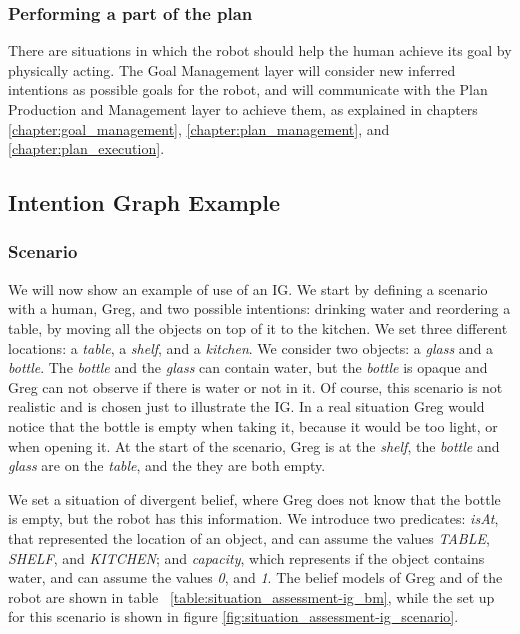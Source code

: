 \subsubsection{Performing a part of the plan}
There are situations in which the robot should help the human achieve its goal by physically acting. The Goal Management layer will consider new inferred intentions as possible goals for the robot, and will communicate with the Plan Production and Management layer to achieve them, as explained in chapters \ref{chapter:goal_management}, \ref{chapter:plan_management}, and \ref{chapter:plan_execution}. 


\subsection{Intention Graph Example}

\subsubsection{Scenario}
We will now show an example of use of an IG. We start by defining a scenario with a human, Greg, and two possible intentions: drinking water and reordering a table, by moving all the objects on top of it to the kitchen. We set three different locations: a \textit{table}, a \textit{shelf}, and a \textit{kitchen}. We consider two objects: a \textit{glass} and a \textit{bottle}. The \textit{bottle} and the \textit{glass} can contain water, but the \textit{bottle} is opaque and Greg can not observe if there is water or not in it. Of course, this scenario is not realistic and is chosen just to illustrate the IG. In a real situation Greg would notice that the bottle is empty when taking it, because it would be too light, or when opening it.
At the start of the scenario, Greg is at the \textit{shelf}, the \textit{bottle} and \textit{glass} are on the \textit{table}, and the they are both empty. 

We set a situation of divergent belief, where Greg does not know that the bottle is empty, but the robot has this information. 
We introduce two predicates: \textit{isAt}, that represented the location of an object, and can assume the values \textit{TABLE}, \textit{SHELF}, and \textit{KITCHEN}; and \textit{capacity}, which represents if the object contains water, and can assume the values \textit{0}, and \textit{1}. 
The belief models of Greg and of the robot are shown in table ~\ref{table:situation_assessment-ig_bm}, while the set up for this scenario is shown in figure \ref{fig:situation_assessment-ig_scenario}.

